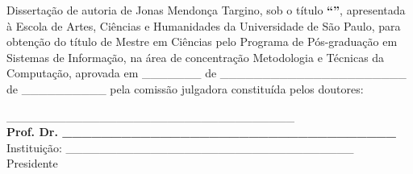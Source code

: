 
\begin{folhadeaprovacao}

\noindent Dissertação de autoria de Jonas Mendonça Targino, sob o título \textbf{``\imprimirtitulo''}, apresentada à Escola de Artes, Ciências e Humanidades da Universidade de São Paulo, para obtenção do título de Mestre em Ciências pelo Programa de Pós-graduação em Sistemas de Informação, na área de concentração Metodologia e Técnicas da Computação, aprovada em \_\_\_\_\_\_\_ de \_\_\_\_\_\_\_\_\_\_\_\_\_\_\_\_\_\_\_\_\_\_ de \_\_\_\_\_\_\_\_\_\_ pela comissão julgadora constituída pelos doutores:


\vspace*{3cm}

\begin{center}
%
% 
% 
% 
% 
% 
%
%
\_\_\_\_\_\_\_\_\_\_\_\_\_\_\_\_\_\_\_\_\_\_\_\_\_\_\_\_\_\_\_\_\_\_%
\vspace*{0.2cm} 
\\ \textbf{Prof. Dr. \_\_\_\_\_\_\_\_\_\_\_\_\_\_\_\_\_\_\_\_\_\_\_\_\_\_\_\_\_\_\_\_\_\_%
} 
\\ \vspace*{0.2cm} 
Instituição: \_\_\_\_\_\_\_\_\_\_\_\_\_\_\_\_\_\_\_\_\_\_\_\_\_\_\_\_\_\_\_\_\_\_%
\\ \vspace*{0.2cm}
Presidente 


\end{center}
\end{folhadeaprovacao}
